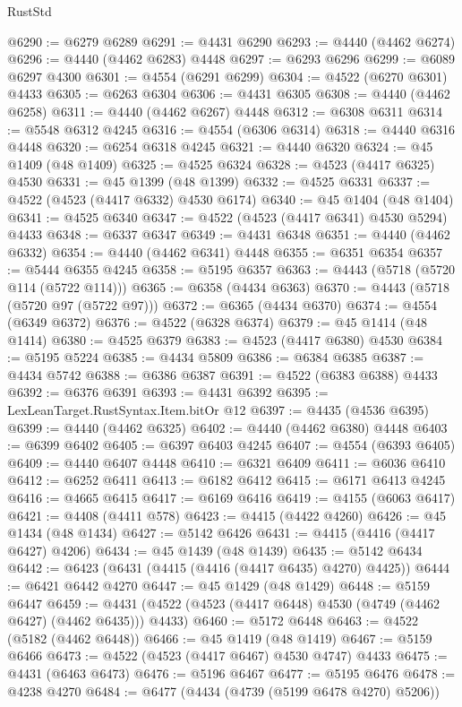 \begin{lexlean}{RustStd}
\begin{coremodule}
{\begin{coremodule}
{{{{{{{{{{{{{{{{{{{{{{{{{{{{{{{{{{{{{{{{{{{{{{{{{{{{{{{{{{{{@6290 := @6279 @6289
@6291 := @4431 @6290
@6293 := @4440 (@4462 @6274)
@6296 := @4440 (@4462 @6283) @4448
@6297 := @6293 @6296
@6299 := @6089 @6297 @4300
@6301 := @4554 (@6291 @6299)
@6304 := @4522 (@6270 @6301) @4433
@6305 := @6263 @6304
@6306 := @4431 @6305
@6308 := @4440 (@4462 @6258)
@6311 := @4440 (@4462 @6267) @4448
@6312 := @6308 @6311
@6314 := @5548 @6312 @4245
@6316 := @4554 (@6306 @6314)
@6318 := @4440 @6316 @4448
@6320 := @6254 @6318 @4245
@6321 := @4440 @6320
@6324 := @45 @1409 (@48 @1409)
@6325 := @4525 @6324
@6328 := @4523 (@4417 @6325) @4530
@6331 := @45 @1399 (@48 @1399)
@6332 := @4525 @6331
@6337 := @4522 (@4523 (@4417 @6332) @4530 @6174)
@6340 := @45 @1404 (@48 @1404)
@6341 := @4525 @6340
@6347 := @4522 (@4523 (@4417 @6341) @4530 @5294) @4433
@6348 := @6337 @6347
@6349 := @4431 @6348
@6351 := @4440 (@4462 @6332)
@6354 := @4440 (@4462 @6341) @4448
@6355 := @6351 @6354
@6357 := @5444 @6355 @4245
@6358 := @5195 @6357
@6363 := @4443 (@5718 (@5720 @114 (@5722 @114)))
@6365 := @6358 (@4434 @6363)
@6370 := @4443 (@5718 (@5720 @97 (@5722 @97)))
@6372 := @6365 (@4434 @6370)
@6374 := @4554 (@6349 @6372)
@6376 := @4522 (@6328 @6374)
@6379 := @45 @1414 (@48 @1414)
@6380 := @4525 @6379
@6383 := @4523 (@4417 @6380) @4530
@6384 := @5195 @5224
@6385 := @4434 @5809
@6386 := @6384 @6385
@6387 := @4434 @5742
@6388 := @6386 @6387
@6391 := @4522 (@6383 @6388) @4433
@6392 := @6376 @6391
@6393 := @4431 @6392
@6395 := LexLeanTarget.RustSyntax.Item.bitOr @12
@6397 := @4435 (@4536 @6395)
@6399 := @4440 (@4462 @6325)
@6402 := @4440 (@4462 @6380) @4448
@6403 := @6399 @6402
@6405 := @6397 @6403 @4245
@6407 := @4554 (@6393 @6405)
@6409 := @4440 @6407 @4448
@6410 := @6321 @6409
@6411 := @6036 @6410
@6412 := @6252 @6411
@6413 := @6182 @6412
@6415 := @6171 @6413 @4245
@6416 := @4665 @6415
@6417 := @6169 @6416
@6419 := @4155 (@6063 @6417)
@6421 := @4408 (@4411 @578)
@6423 := @4415 (@4422 @4260)
@6426 := @45 @1434 (@48 @1434)
@6427 := @5142 @6426
@6431 := @4415 (@4416 (@4417 @6427) @4206)
@6434 := @45 @1439 (@48 @1439)
@6435 := @5142 @6434
@6442 := @6423 (@6431 (@4415 (@4416 (@4417 @6435) @4270) @4425))
@6444 := @6421 @6442 @4270
@6447 := @45 @1429 (@48 @1429)
@6448 := @5159 @6447
@6459 := @4431 (@4522 (@4523 (@4417 @6448) @4530 (@4749 (@4462 @6427) (@4462 @6435))) @4433)
@6460 := @5172 @6448
@6463 := @4522 (@5182 (@4462 @6448))
@6466 := @45 @1419 (@48 @1419)
@6467 := @5159 @6466
@6473 := @4522 (@4523 (@4417 @6467) @4530 @4747) @4433
@6475 := @4431 (@6463 @6473)
@6476 := @5196 @6467
@6477 := @5195 @6476
@6478 := @4238 @4270
@6484 := @6477 (@4434 (@4739 (@5199 @6478 @4270) @5206))
}}}}}}}}}}}}}}}}}}}}}}}}}}}}}}}}}}}}}}}}}}}}}}}}}}}}}}}}}}}}
\end{coremodule}}
\end{coremodule}
\end{lexlean}
